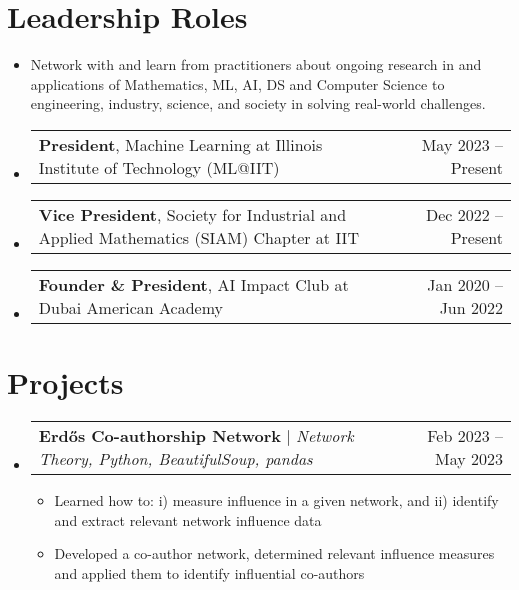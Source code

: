 \documentclass[letterpaper,10pt]{article}
\makeatletter
\newcommand{\resumeItem}[1]{
  \item\small{
    {#1 \vspace{-2pt}}
  }
}
\newcommand{\resumeSubSubheading}[2]{
    \item
    \begin{tabular*}{0.97\textwidth}{l@{\extracolsep{\fill}}r}
      #1 & #2 \\
    \end{tabular*}\vspace{-7pt}
}
\newcommand{\resumeSubHeadingListStart}{\begin{itemize}[leftmargin=0.15in, label=]}
\newcommand{\resumeSubHeadingListEnd}{\end{itemize}}
\newcommand{\resumeItemListStart}{\begin{itemize}[label=]}
\newcommand{\resumeItemListEnd}{\end{itemize}\vspace{-5pt}}
\makeatother
\begin{document}
\section{Leadership Roles}
\resumeSubHeadingListStart
    \resumeItem{Network with and learn from practitioners about ongoing research in and applications of Mathematics, ML, AI, DS and Computer Science to engineering, industry, science, and society in solving real-world challenges.}
    \resumeSubSubheading{\textbf{President}, Machine Learning at Illinois Institute of Technology (ML@IIT)}{May 2023 -- Present}
    \resumeSubSubheading{\textbf{Vice President}, Society for Industrial and Applied Mathematics (SIAM) Chapter at IIT}{Dec 2022 -- Present}
    \resumeSubSubheading{\textbf{Founder \& President}, AI Impact Club at Dubai American Academy}{Jan 2020 -- Jun 2022}
\resumeSubHeadingListEnd


\newcommand{\resumeProjectHeading}[2]{
    \item
    \begin{tabular*}{0.97\textwidth}{l@{\extracolsep{\fill}}r}
        #1 & \small#2 \\
    \end{tabular*}\vspace{-7pt}
}

\section{Projects}
\resumeSubHeadingListStart
    \resumeProjectHeading{\textbf{Erd\H{o}s Co-authorship Network} $|$ \emph{Network Theory, Python, BeautifulSoup, pandas}}{Feb 2023 -- May 2023}
        \resumeItemListStart
            \resumeItem{Learned how to: i) measure influence in a given network, and ii) identify and extract relevant network influence data}
            \resumeItem{Developed a co-author network, determined relevant influence measures and applied them to identify influential co-authors}
        \resumeItemListEnd
\resumeSubHeadingListEnd
\end{document}
